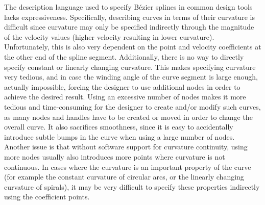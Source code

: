 \documentclass[a4paper]{article}
\begin{document}
				The description language used to specify Bézier splines in common design tools lacks expressiveness. Specifically, describing curves in terms of their curvature is difficult since curvature may only be specified indirectly through the magnitude of the velocity values (higher velocity resulting in lower curvature). Unfortunately, this is also very dependent on the point and velocity coefficients at the other end of the spline segment. Additionally, there is no way to directly specify constant or linearly changing curvature. This makes specifying curvature very tedious, and in case the winding angle of the curve segment is large enough, actually impossible, forcing the designer to use additional nodes in order to achieve the desired result. Using an excessive number of nodes makes it more tedious and time-consuming for the designer to create and/or modify such curves, as many nodes and handles have to be created or moved in order to change the overall curve. It also sacrifices smoothness, since it is easy to accidentally introduce subtle bumps in the curve when using a large number of nodes. Another issue is that without software support for curvature continuity, using more nodes usually also introduces more points where curvature is not continuous. In cases where the curvature is an important property of the curve (for example the constant curvature of circular arcs, or the linearly changing curvature of spirals), it may be very difficult to specify these properties indirectly using the coefficient points.
\end{document}
